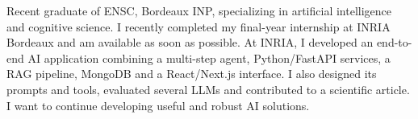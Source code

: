
\begin{cvparagraph}
Recent graduate of ENSC, Bordeaux INP, specializing in artificial intelligence and cognitive science. I recently completed my final-year internship at INRIA Bordeaux and am available as soon as possible. At INRIA, I developed an end-to-end AI application combining a multi-step agent, Python/FastAPI services, a RAG pipeline, MongoDB and a React/Next.js interface. I also designed its prompts and tools, evaluated several LLMs and contributed to a scientific article. I want to continue developing useful and robust AI solutions.
\end{cvparagraph}
